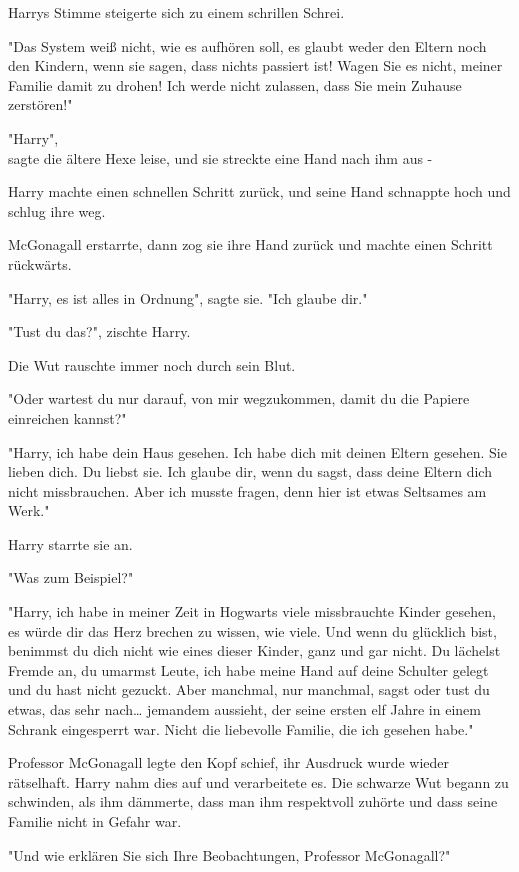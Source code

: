 {Harrys Stimme steigerte sich zu einem schrillen Schrei.

"Das System weiß nicht, wie es aufhören soll, es glaubt weder den Eltern noch den Kindern, wenn sie sagen, dass nichts passiert ist! Wagen Sie es nicht, meiner Familie damit zu drohen! Ich werde nicht zulassen, dass Sie mein Zuhause zerstören!"

"Harry",\\ sagte die ältere Hexe leise, und sie streckte eine Hand nach ihm aus -

Harry machte einen schnellen Schritt zurück, und seine Hand schnappte hoch und schlug ihre weg.

McGonagall erstarrte, dann zog sie ihre Hand zurück und machte einen Schritt rückwärts.

"Harry, es ist alles in Ordnung", sagte sie. "Ich glaube dir."

"Tust du das?", zischte Harry.

Die Wut rauschte immer noch durch sein Blut.

"Oder wartest du nur darauf, von mir wegzukommen, damit du die Papiere einreichen kannst?"

"Harry, ich habe dein Haus gesehen. Ich habe dich mit deinen Eltern gesehen. Sie lieben dich. Du liebst sie. Ich glaube dir, wenn du sagst, dass deine Eltern dich nicht missbrauchen. Aber ich musste fragen, denn hier ist etwas Seltsames am Werk."

Harry starrte sie an.

"Was zum Beispiel?"

"Harry, ich habe in meiner Zeit in Hogwarts viele missbrauchte Kinder gesehen, es würde dir das Herz brechen zu wissen, wie viele. Und wenn du glücklich bist, benimmst du dich nicht wie eines dieser Kinder, ganz und gar nicht. Du lächelst Fremde an, du umarmst Leute, ich habe meine Hand auf deine Schulter gelegt und du hast nicht gezuckt. Aber manchmal, nur manchmal, sagst oder tust du etwas, das sehr nach… jemandem aussieht, der seine ersten elf Jahre in einem Schrank eingesperrt war. Nicht die liebevolle Familie, die ich gesehen habe."

Professor McGonagall legte den Kopf schief, ihr Ausdruck wurde wieder rätselhaft. Harry nahm dies auf und verarbeitete es. Die schwarze Wut begann zu schwinden, als ihm dämmerte, dass man ihm respektvoll zuhörte und dass seine Familie nicht in Gefahr war.

"Und wie erklären Sie sich Ihre Beobachtungen, Professor McGonagall?"

}
